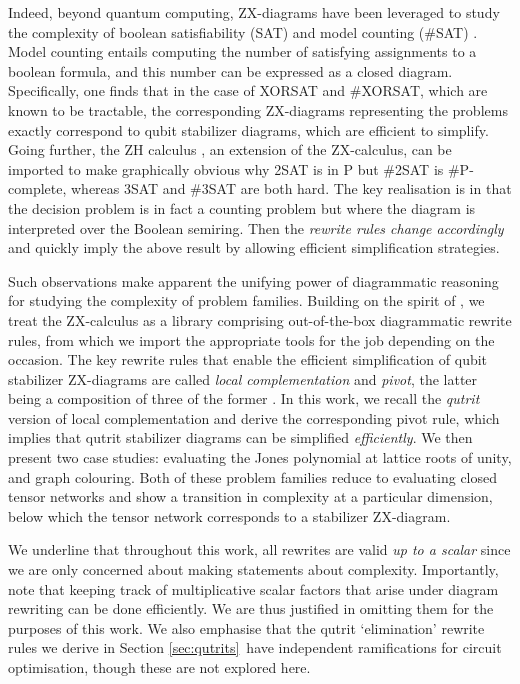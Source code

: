 Indeed, beyond quantum computing, ZX-diagrams have been leveraged to study the complexity of boolean satisfiability (SAT) and model counting (\#SAT) \cite{debeaudrap2020tensor}.
Model counting entails computing the number of satisfying assignments to a boolean formula,
and this number can be expressed as a closed diagram.
Specifically, one finds that in the case of XORSAT and \#XORSAT,
which are known to be tractable,
the corresponding ZX-diagrams representing the problems exactly correspond to qubit stabilizer diagrams, which are efficient to simplify.
Going further, the ZH calculus \cite{backens2018zh}, an extension of the ZX-calculus, can be imported to make graphically obvious
why 2SAT is in P but \#2SAT is \#P-complete, whereas 3SAT and \#3SAT are both hard.
The key realisation is in that the decision problem is in fact a counting problem
but where the diagram is interpreted over the Boolean semiring.
Then the \emph{rewrite rules change accordingly} and quickly imply the above result by allowing efficient simplification strategies.

Such observations make apparent the unifying power of diagrammatic reasoning
for studying the complexity of problem families.  
Building on the spirit of \cite{debeaudrap2020tensor}, we treat the ZX-calculus as a library comprising out-of-the-box diagrammatic rewrite rules, from which we import the appropriate tools for the job depending on the occasion.
The key rewrite rules that enable the efficient simplification
of qubit stabilizer ZX-diagrams
are called \emph{local complementation} and \emph{pivot},
the latter being a composition of three of the former \cite{graph_theoretic_simplification}.
In this work, we recall the \emph{qutrit} version of local complementation and derive the corresponding pivot rule,
which implies that qutrit stabilizer diagrams can be simplified \emph{efficiently}.
We then present two case studies: evaluating the Jones polynomial at lattice roots of unity, and graph colouring.
Both of these problem families reduce to evaluating
closed tensor networks and show a transition in complexity
at a particular dimension, below which the tensor network corresponds to a stabilizer ZX-diagram.

We underline that throughout this work, all rewrites are valid
\emph{up to a scalar}
since we are only concerned about making statements about complexity.
Importantly, note that keeping track of multiplicative scalar factors that arise under diagram rewriting can be done efficiently.
We are thus justified in omitting them for the purposes of this work. We also emphasise that the qutrit `elimination' rewrite rules we derive in Section \ref{sec:qutrits}\ have independent ramifications for circuit optimisation, though these are not explored here.
